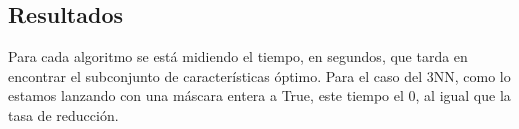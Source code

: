 \documentclass[12pt]{article}
\begin{document}
\subsection{Resultados}

Para cada algoritmo se está midiendo el tiempo, en segundos, que tarda en encontrar el subconjunto de características óptimo. Para el caso del 3NN, como lo estamos lanzando con una máscara entera a True, este tiempo el 0, al igual que la tasa de reducción.

\begin{table}[H]
\centering
\caption{Resultados SFS}
\label{Resultados SFS}
\end{table}
\end{document}
